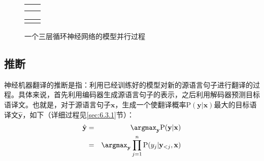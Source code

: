 \begin{figure}[htp]
\centering
\begin{tabular}{l l}
\subfigure[]{} &\subfigure[]{} \\
\subfigure[]{}  &\subfigure[]{} \\
\end{tabular}
\end{figure}
\begin{figure}[htp]
\centering
\begin{tabular}{l l}
\subfigure[]{}  &\subfigure[]{}
\end{tabular}
\caption{一个三层循环神经网络的模型并行过程}
\label{fig:6-31}
\end{figure}
\subsection{推断}

\parinterval 神经机器翻译的推断是指：利用已经训练好的模型对新的源语言句子进行翻译的过程。具体来说，首先利用编码器生成源语言句子的表示，之后利用解码器预测目标语译文。也就是，对于源语言句子$\mathbf{x}$，生成一个使翻译概率$\textrm{P}(\mathbf{y} | \mathbf{x})$最大的目标语译文$\hat{\mathbf{y}}$，如下（详细过程见\ref{sec:6.3.1}节）：
\begin{eqnarray}
\hat{\mathbf{y}} & = & \argmax_{\mathbf{y}} \textrm{P}(\mathbf{y} | \mathbf{x}) \nonumber \\
                 & = & \argmax_{\mathbf{y}} \prod_{j=1}^n \textrm{P}(y_j | \mathbf{y}_{<j},\mathbf{x})
\label{eq:6-35}
\end{eqnarray}

